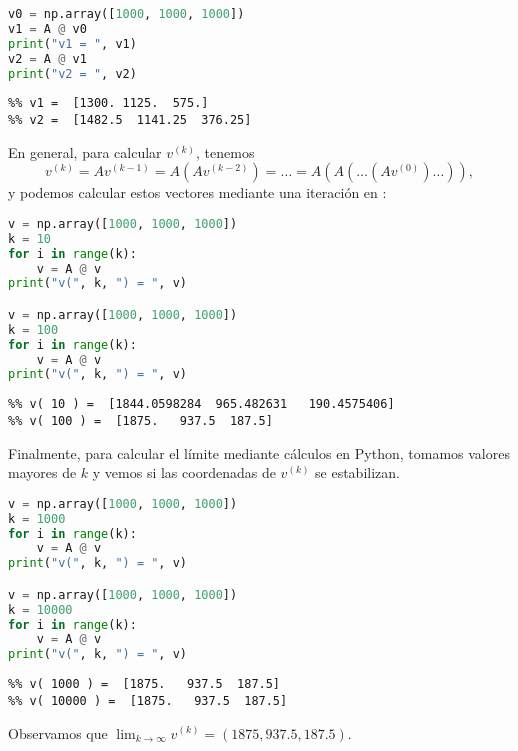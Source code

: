 \begin{ejemplo}
\begin{Shaded}
\begin{lstlisting}[language=python]
v0 = np.array([1000, 1000, 1000])
v1 = A @ v0
print("v1 = ", v1)
v2 = A @ v1
print("v2 = ", v2)
\end{lstlisting}
\end{Shaded}

\begin{verbatim}
%% v1 =  [1300. 1125.  575.]
%% v2 =  [1482.5  1141.25  376.25]
\end{verbatim}

En general, para calcular $v^{(k)}$, tenemos
$$
v^{(k)} = A v^{(k - 1)} = A (A v^{(k-2)}) = \dots = A ( A (\dots ( A v^{(0)})\dots)),
$$
y podemos calcular estos vectores mediante una iteración en \python:

\begin{Shaded}
\begin{lstlisting}[language=python]
v = np.array([1000, 1000, 1000])
k = 10
for i in range(k):
    v = A @ v
print("v(", k, ") = ", v)

v = np.array([1000, 1000, 1000])
k = 100
for i in range(k):
    v = A @ v
print("v(", k, ") = ", v)
\end{lstlisting}
\end{Shaded}

\begin{verbatim}
%% v( 10 ) =  [1844.0598284  965.482631   190.4575406]
%% v( 100 ) =  [1875.   937.5  187.5]
\end{verbatim}

Finalmente, para calcular el límite mediante cálculos en Python, tomamos valores mayores de $k$ y vemos si las coordenadas de $v^{(k)}$ se estabilizan.

\begin{Shaded}
\begin{lstlisting}[language=python]
v = np.array([1000, 1000, 1000])
k = 1000
for i in range(k):
    v = A @ v
print("v(", k, ") = ", v)

v = np.array([1000, 1000, 1000])
k = 10000
for i in range(k):
    v = A @ v
print("v(", k, ") = ", v)
\end{lstlisting}
\end{Shaded}

\begin{verbatim}
%% v( 1000 ) =  [1875.   937.5  187.5]
%% v( 10000 ) =  [1875.   937.5  187.5]
\end{verbatim}

Observamos que $\lim_{k \rightarrow \infty} v^{(k)} = (1875, 937.5, 187.5)$.

\end{ejemplo}

